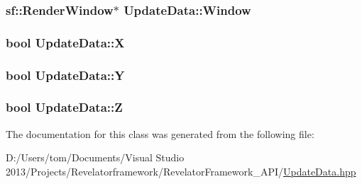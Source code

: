 \hypertarget{class_update_data_a55a408e4c722338ac61cc8d53ae704d2}{
\subsubsection[{Window}]{\setlength{\rightskip}{0pt plus 5cm}sf\-::\-Render\-Window$\ast$ Update\-Data\-::\-Window\hspace{0.3cm}{\ttfamily [private]}}}\label{class_update_data_a55a408e4c722338ac61cc8d53ae704d2}
\hypertarget{class_update_data_a10a2666372025908c0db20e1d8b4651e}{
\subsubsection[{X}]{\setlength{\rightskip}{0pt plus 5cm}bool Update\-Data\-::\-X\hspace{0.3cm}{\ttfamily [private]}}}\label{class_update_data_a10a2666372025908c0db20e1d8b4651e}
\hypertarget{class_update_data_a64c1689912e748c656418e3d81cc3e4a}{
\subsubsection[{Y}]{\setlength{\rightskip}{0pt plus 5cm}bool Update\-Data\-::\-Y\hspace{0.3cm}{\ttfamily [private]}}}\label{class_update_data_a64c1689912e748c656418e3d81cc3e4a}
\hypertarget{class_update_data_ab3e80604d2336942286e78e83fecfc59}{
\subsubsection[{Z}]{\setlength{\rightskip}{0pt plus 5cm}bool Update\-Data\-::\-Z\hspace{0.3cm}{\ttfamily [private]}}}\label{class_update_data_ab3e80604d2336942286e78e83fecfc59}


The documentation for this class was generated from the following file\-:\begin{DoxyCompactItemize}
\item 
D\-:/\-Users/tom/\-Documents/\-Visual Studio 2013/\-Projects/\-Revelatorframework/\-Revelator\-Framework\-\_\-\-A\-P\-I/\hyperlink{_update_data_8hpp}{Update\-Data.\-hpp}\end{DoxyCompactItemize}

